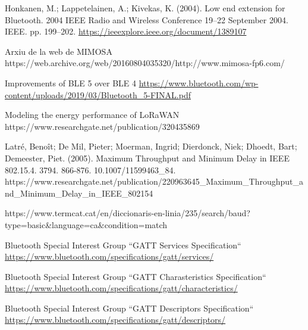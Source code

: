 \begin{thebibliography}{2}


Honkanen, M.; Lappetelainen, A.; Kivekas, K. (2004). Low end extension for Bluetooth. 2004 IEEE Radio and Wireless Conference 19–22 September 2004. IEEE. pp. 199–202. \href{https://ieeexplore.ieee.org/document/1389107}{https://ieeexplore.ieee.org/document/1389107}

Arxiu de la web de MIMOSA
https://web.archive.org/web/20160804035320/http://www.mimosa-fp6.com/

Improvements of BLE 5 over BLE 4
\href{https://www.bluetooth.com/wp-content/uploads/2019/03/Bluetooth\_5-FINAL.pdf}{https://www.bluetooth.com/wp-content/uploads/2019/03/Bluetooth\_5-FINAL.pdf}

Modeling the energy performance of LoRaWAN
https://www.researchgate.net/publication/320435869

Latré, Benoît; De Mil, Pieter; Moerman, Ingrid; Dierdonck, Niek; Dhoedt, Bart; Demeester, Piet. (2005). Maximum Throughput and Minimum Delay in IEEE 802.15.4. 3794. 866-876. 10.1007/11599463\_84. 
https://www.researchgate.net/publication/220963645\_Maximum\_Throughput\_and\_Minimum\_Delay\_in\_IEEE\_802154

https://www.termcat.cat/en/diccionaris-en-linia/235/search/baud?type=basic\&language=ca\&condition=match

Bluetooth Special Interest Group
``GATT Services Specification``
\href{https://www.bluetooth.com/specifications/gatt/services/}{https://www.bluetooth.com/specifications/gatt/services/}

Bluetooth Special Interest Group
``GATT Charasteristics Specification``
\href{https://www.bluetooth.com/specifications/gatt/characteristics/}{https://www.bluetooth.com/specifications/gatt/characteristics/}

Bluetooth Special Interest Group
``GATT Descriptors Specification``
\href{https://www.bluetooth.com/specifications/gatt/descriptors/}{https://www.bluetooth.com/specifications/gatt/descriptors/}


\end{thebibliography}
